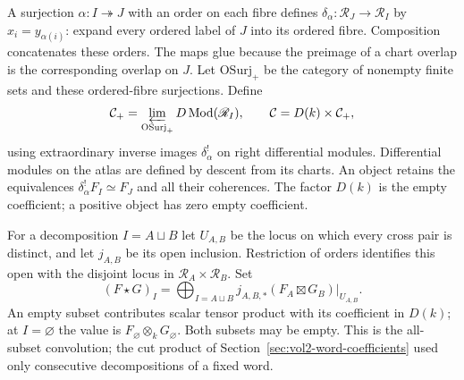 A surjection $\alpha:I\twoheadrightarrow J$ with an order on each
fibre defines $\delta_\alpha:\mathscr R_J\to\mathscr R_I$ by
$x_i=y_{\alpha(i)}$: expand every ordered label of $J$ into its
ordered fibre. Composition concatenates these orders. The maps
glue because the preimage of a chart overlap is the corresponding
overlap on $J$. Let $\mathrm{OSurj}_+$ be the category of nonempty
finite sets and these ordered-fibre surjections. Define
\begin{equation}\label{eq:vol2-full-coefficient-category}
 \mathcal C_+=\varprojlim_{\mathrm{OSurj}_+}
                 D\operatorname{Mod}(\mathscr R_I),
 \qquad \mathcal C=D(k)\times\mathcal C_+,
\end{equation}
using extraordinary inverse images $\delta_\alpha^!$ on right
differential modules. Differential modules on the atlas are defined
by descent from its charts. An object retains the equivalences
$\delta_\alpha^!F_I\simeq F_J$ and all their coherences.
The factor $D(k)$ is the empty coefficient; a positive object has
zero empty coefficient.

For a decomposition $I=A\sqcup B$ let $U_{A,B}$ be the locus on
which every cross pair is distinct, and let $j_{A,B}$ be its open
inclusion. Restriction of orders identifies this open with the
disjoint locus in $\mathscr R_A\times\mathscr R_B$. Set
\begin{equation}\label{eq:vol2-full-convolution}
 (F\star G)_I=
 \bigoplus_{I=A\sqcup B}j_{A,B,*}
             (F_A\boxtimes G_B)|_{U_{A,B}}.
\end{equation}
An empty subset contributes scalar tensor product with its coefficient
in $D(k)$; at $I=\varnothing$ the value is
$F_\varnothing\otimes_kG_\varnothing$.
Both subsets may be empty. This is the all-subset convolution; the
cut product of Section~\ref{sec:vol2-word-coefficients} used only
consecutive decompositions of a fixed word.

